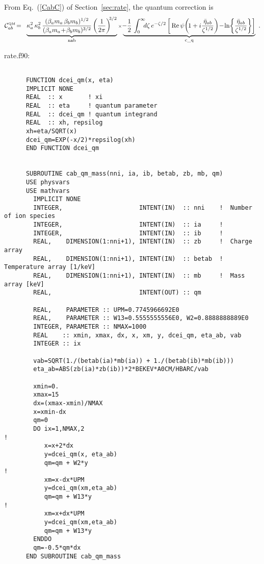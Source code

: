 \documentclass[preprint,12pt,eqsecnum,nofootinbib,amsmath,amssymb]{revtex4}
\newcommand{\smQM}{{\rm\scriptscriptstyle QM}}
\begin{document}
{{{{{{From Eq.~(\ref{CabC}) of Section~\ref{sec:rate}, the quantum
correction is
\begin{eqnarray}
  {\cal C}^\smQM_{ab} 
  &\!=\!&  
  \underbrace{
  \kappa_a^2\, \kappa_b^2 \, 
  \frac{(\beta_a m_a \, \beta_b m_b)^{1/2}}{(\beta_a m_a \!+\! 
  \beta_b m_b)^{3/2}} 
  \left(\frac{1}{2\pi}\right)^{\!\!3/2} 
  }_{\rm nab}  {\scriptstyle\times}
  \underbrace{
    \!-\frac{1}{2} \, 
  \int_0^\infty \!\!\! d \zeta\, e^{-\zeta/2} 
  \left[\,{\rm Re}\,
  \psi\!\left(\!1 + i\frac{\bar\eta_{ab}}{\zeta^{1/2}}\right) \!-\! 
  \ln\!\left\{ \frac{\bar\eta_{ab}}{\zeta^{1/2}}\right\}
  \right] }_{\rm c\_q}
  \ .
\nonumber \\
\label{CabC_two}
\end{eqnarray}




\vskip0.1cm 
\noindent
rate.f90:
{
\baselineskip 10pt
\begin{verbatim}

      FUNCTION dcei_qm(x, eta)
      IMPLICIT NONE
      REAL  :: x       ! xi
      REAL  :: eta     ! quantum parameter
      REAL  :: dcei_qm ! quantum integrand
      REAL  :: xh, repsilog
      xh=eta/SQRT(x)
      dcei_qm=EXP(-x/2)*repsilog(xh) 
      END FUNCTION dcei_qm


      SUBROUTINE cab_qm_mass(nni, ia, ib, betab, zb, mb, qm)
      USE physvars
      USE mathvars
        IMPLICIT NONE
        INTEGER,                     INTENT(IN)  :: nni    !  Number of ion species
        INTEGER,                     INTENT(IN)  :: ia     !  
        INTEGER,                     INTENT(IN)  :: ib     !  
        REAL,    DIMENSION(1:nni+1), INTENT(IN)  :: zb     !  Charge array
        REAL,    DIMENSION(1:nni+1), INTENT(IN)  :: betab  !  Temperature array [1/keV]
        REAL,    DIMENSION(1:nni+1), INTENT(IN)  :: mb     !  Mass array [keV]
        REAL,                        INTENT(OUT) :: qm

        REAL,    PARAMETER :: UPM=0.7745966692E0
        REAL,    PARAMETER :: W13=0.5555555556E0, W2=0.8888888889E0
        INTEGER, PARAMETER :: NMAX=1000
        REAL    :: xmin, xmax, dx, x, xm, y, dcei_qm, eta_ab, vab
        INTEGER :: ix

        vab=SQRT(1./(betab(ia)*mb(ia)) + 1./(betab(ib)*mb(ib)))
        eta_ab=ABS(zb(ia)*zb(ib))*2*BEKEV*A0CM/HBARC/vab

        xmin=0.
        xmax=15
        dx=(xmax-xmin)/NMAX
        x=xmin-dx
        qm=0
        DO ix=1,NMAX,2
!     
           x=x+2*dx
           y=dcei_qm(x, eta_ab)
           qm=qm + W2*y
!
           xm=x-dx*UPM
           y=dcei_qm(xm,eta_ab)
           qm=qm + W13*y
!
           xm=x+dx*UPM
           y=dcei_qm(xm,eta_ab)
           qm=qm + W13*y
        ENDDO
        qm=-0.5*qm*dx
      END SUBROUTINE cab_qm_mass
\end{verbatim}



}}}}}}}
\end{document}
